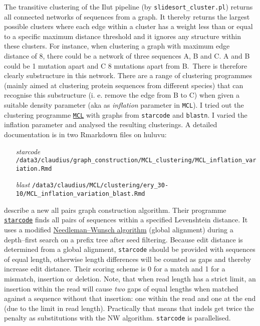 \documentclass{article}\usepackage[]{graphicx}\usepackage[]{color}
\begin{document}
The transitive clustering of the Ilut pipeline (by \texttt{slidesort\_cluster.pl}) returns all connected networks of sequences from a graph. It thereby returns the largest possible clusters where each edge within a cluster has a weight less than or equal to a specific maximum distance threshold and it ignores any structure within these clusters. For instance, when clustering a graph with maximum edge distance of 8, there could be a network of three sequences A, B and C. A and B could be 1 mutation apart and C 8 mutations apart from B.~There is therefore clearly substructure in this network. There are a range of clustering programmes (mainly aimed at clustering protein sequences from different species) that can recognise this substructure (i. e. remove the edge from B to C) when given a suitable density parameter (aka as \emph{inflation} parameter in \texttt{MCL}). I tried out the clustering programme \href{http://micans.org/mcl/}{\texttt{MCL}} with graphs from \texttt{starcode} and \texttt{blastn}. I varied the inflation parameter and analysed the resulting clusterings. A detailed documentation is in two Rmarkdown files on huluvu: 
\begin{itemize}
\item[\emph{starcode}] \texttt{/data3/claudius/graph\_construction/MCL\_clustering/MCL\_inflation\_variation.Rmd}
\item[\emph{blast}] \texttt{/data3/claudius/MCL/clustering/ery\_30-10/MCL\_inflation\_variation\_blast.Rmd}
\end{itemize}

\cite{Zorita2015} describe a new \gls{all pairs} graph construction algorithm. Their programme \href{https://github.com/gui11aume/starcode}{\texttt{starcode}} finds all pairs of sequences within a specified \gls{Levenshtein distance}. It uses a modified \href{https://en.wikipedia.org/wiki/Needleman\%E2\%80\%93Wunsch_algorithm}{Needleman--Wunsch algorithm} (global alignment) during a depth--first search on a prefix tree after seed filtering. Because edit distance is determined from a global alignment, \texttt{starcode} should be provided with sequences of equal length, otherwise length differences will be counted as gaps and thereby increase edit distance. Their scoring scheme is 0 for a match and 1 for a mismatch, insertion or deletion. Note, that when read length has a strict limit, an insertion within the read will cause \emph{two} gaps of equal lengths when matched against a sequence without that insertion: one within the read and one at the end (due to the limit in read length). Practically that means that indels get twice the penalty as substitutions with the NW algorithm. \texttt{starcode} is parallelised. 
\end{document}
